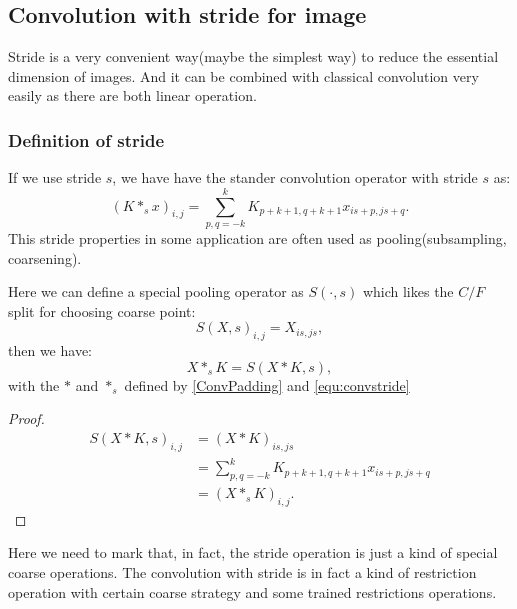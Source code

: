 \subsection{Convolution with stride for image}
Stride is a very convenient way(maybe the simplest way) to reduce the essential dimension of images. And it can be combined with classical convolution very easily as there are both linear operation.
\subsubsection{Definition of stride}
If we use stride $s$, we have have the stander convolution operator with stride $s$ as:
\begin{equation}\label{equ:convstride}
(K\ast_{s} x)_{i,j} = \sum_{p, q = -k}^k K_{p+k+1,q+k+1}x_{is + p, js + q} .
\end{equation}
This stride properties in some application are often used as pooling(subsampling, coarsening).  

Here we can define a special pooling operator as $S(\cdot,s)$ which likes the $C/F$ split for choosing coarse point:
\begin{equation}
S(X,s)_{i,j} = X_{is, js },
\end{equation}
then we have:
\begin{equation}\label{equ:stride}
X \ast_s K = S(X\ast K, s),
\end{equation}
with the $\ast$ and $\ast_s$ defined by \eqref{ConvPadding} and \eqref{equ:convstride}
\begin{proof}
	\begin{align}
	S(X \ast K,s)_{i,j} &= (X \ast K)_{is, js}  \\
	&= \sum_{p, q = -k}^k K_{p+k+1,q+k+1}x_{is + p, js + q}  \\
	&= (X \ast_s K)_{i,j}.
	\end{align}
\end{proof}

\begin{remark}
	Here we need to mark that, in fact, the stride operation is just a kind of special coarse operations. The convolution with stride is in fact a kind of restriction operation with certain coarse strategy and some trained restrictions operations. 
\end{remark}



